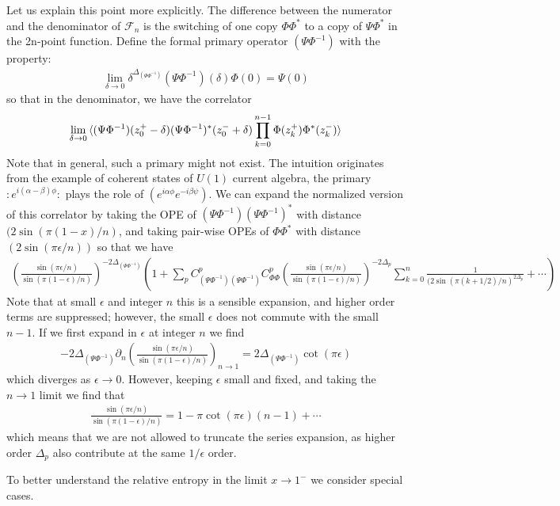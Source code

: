 \documentclass[11pt]{article}
\newcommand{\ep}{\epsilon}
\newcommand{\p}{\partial}
\newcommand{\lb}{\left(}
\newcommand{\rb}{\right)}
\begin{document}
Let us explain this point more explicitly. The difference between the numerator and the denominator of $\mathcal{F}_n$ is the switching of one copy $\Phi\Phi^*$ to a copy of $\Psi\Phi^*$ in the 2n-point function. Define the formal primary operator $(\Psi\Phi^{-1})$ with the property:
\begin{align}
    \lim_{\delta\to 0}\delta^{\Delta_{(\Psi\Phi^{-1})}}(\Psi\Phi^{-1})(\delta)\Phi(0)=\Psi(0)
\end{align}
so that in the denominator, we have the correlator
\begin{align}
  \lim_{\delta\to 0}  \braket{(\Psi\Phi^{-1})(z_0^+-\delta)(\Psi\Phi^{-1})^*(z_0^-+\delta)\prod_{k=0}^{n-1}\Phi(z_k^+)\Phi^*(z_k^-)}
\end{align}
Note that in general, such a primary might not exist. The intuition originates from the example of coherent states of $U(1)$ current algebra, the primary   $: e^{i(\alpha-\beta)\phi}:$ plays the role of $(e^{i\alpha \phi}e^{-i\beta\psi})$.
We can expand the normalized version of this correlator by taking the OPE of $(\Psi\Phi^{-1})(\Psi\Phi^{-1})^*$ with distance $(2\sin(\pi(1-x)/n)$, and taking pair-wise OPEs of $\Phi\Phi^*$ with distance $(2\sin(\pi \ep/n))$ so that we have
\begin{align}
    \lb \frac{\sin(\pi \ep/n)}{\sin(\pi (1-\ep)/n)}\rb^{-2\Delta_{(\Psi\Phi^{-1})}}\lb 1+\sum_p C^p_{(\Psi\Phi^{-1})(\Psi\Phi^{-1})} C^p_{\Phi\Phi}\lb \frac{\sin(\pi \ep/n)}{\sin(\pi (1-\ep)/n)}\rb^{-2\Delta_p}\sum_{k=0}^n\frac{1}{(2\sin(\pi (k+1/2)/n)^{2\Delta_p}}+\cdots\rb
\end{align}
Note that at small $\ep$ and integer $n$ this is a sensible expansion, and higher order terms are suppressed; however, the small $\ep$ does not commute with the small $n-1$. If we first expand in $\ep$ at integer $n$ we find
\begin{align}
    -2\Delta_{(\Psi\Phi^{-1})}\p_n\lb \frac{\sin(\pi \ep/n)}{\sin(\pi (1-\ep)/n)}\rb_{n\to 1}=2\Delta_{(\Psi\Phi^{-1})}\cot(\pi\ep)
\end{align}
which diverges as $\ep\to 0$. However, keeping $\ep$ small and fixed, and taking the $n\to 1$ limit we find that 
\begin{align}
    \frac{\sin(\pi \ep/n)}{\sin(\pi (1-\ep)/n)}=1-\pi\cot(\pi \ep)(n-1)+\cdots
\end{align}
which means that we are not allowed to truncate the series expansion, as higher order $\Delta_p$ also contribute at the same $1/\ep$ order.


To better understand the relative entropy in the limit $x\to 1^-$ we consider special cases.
\end{document}
